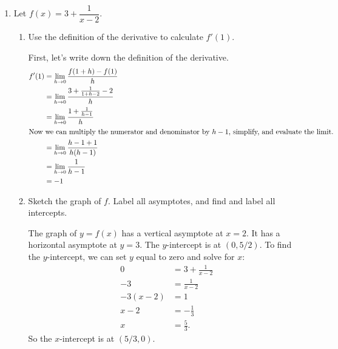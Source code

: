 \documentclass{article}
\begin{document}
\begin{enumerate}
\begin{enumerate}
  \end{enumerate}

\item 
  Let $f(x) = 3 + \dfrac{1}{x - 2}$.

  \begin{enumerate}
  \item
    \begin{problem}[\nstretch{1.5}]
      Use the definition of the derivative to calculate $f'(1)$. 
    \end{problem}

    \begin{solution}
      First, let's write down the definition of the derivative. 
      \begin{align*}
        f'(1) &= \lim_{h \to 0} \frac{f(1+h)-f(1)}{h} \\
        &= \lim_{h \to 0} \frac{3 + \frac{1}{1+h-2} - 2}{h} \\
        &= \lim_{h \to 0} \frac{1 + \frac{1}{h-1}}{h} \\
        \intertext{Now we can multiply the numerator and denominator
        by $h-1$, simplify, and evaluate the limit.}
        &= \lim_{h \to 0} \frac{h-1 + 1}{h(h-1)} \\
        &= \lim_{h \to 0} \frac{1}{h-1} \\
        &= -1
      \end{align*}
    \end{solution}

  \item

    \begin{problem}[\vfill]
      Sketch the graph of $f$. Label all asymptotes, and find and label all intercepts.
    \end{problem}

    \begin{solution}
      The graph of $y=f(x)$ has a vertical asymptote at $x=2$. It has a horizontal asymptote
      at $y=3$. The $y$-intercept is at $(0, 5/2)$. To find the $y$-intercept,
      we can set $y$ equal to zero and solve for $x$:
      \begin{align*}
        0 &= 3 + \frac{1}{x-2} \\
        -3 &= \frac{1}{x-2} \\
        -3(x-2) &= 1 \\
        x-2 &= -\frac{1}{3} \\
        x &= \frac{5}{3}.
      \end{align*}
      So the $x$-intercept is at $(5/3,0)$. 


\end{solution}
\end{enumerate}
\end{enumerate}
\end{document}
